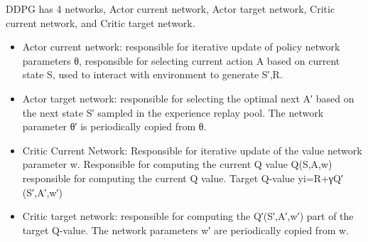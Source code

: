 \documentclass[13pt]{ctexart}
\begin{document}
DDPG has 4 networks, Actor current network, Actor target network, Critic current network, and Critic target network.
\begin{itemize}
	\item Actor current network: responsible for iterative update of policy network parameters θ, responsible for selecting current action A based on current state S, used to interact with environment to generate S′,R.
	\item Actor target network: responsible for selecting the optimal next A′ based on the next state S′ sampled in the experience replay pool. The network parameter θ′ is periodically copied from θ.
	\item Critic Current Network: Responsible for iterative update of the value network parameter w. Responsible for computing the current Q value Q(S,A,w) responsible for computing the current Q value. Target Q-value yi=R+γQ′(S′,A′,w′)
	\item Critic target network: responsible for computing the Q′(S′,A′,w′) part of the target Q-value. The network parameters w′ are periodically copied from w.
\end{itemize}
\end{document}

